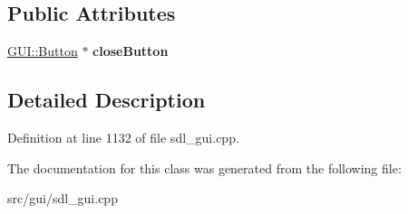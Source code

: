 \subsection*{Public Attributes}
\begin{DoxyCompactItemize}
\item 
\hypertarget{classConfigurationWindow_a95eb72938fb54063c6c5094f47901c1d}{\hyperlink{classGUI_1_1Button}{G\-U\-I\-::\-Button} $\ast$ {\bfseries close\-Button}}\label{classConfigurationWindow_a95eb72938fb54063c6c5094f47901c1d}

\end{DoxyCompactItemize}


\subsection{Detailed Description}


Definition at line 1132 of file sdl\-\_\-gui.\-cpp.



The documentation for this class was generated from the following file\-:\begin{DoxyCompactItemize}
\item 
src/gui/sdl\-\_\-gui.\-cpp\end{DoxyCompactItemize}
